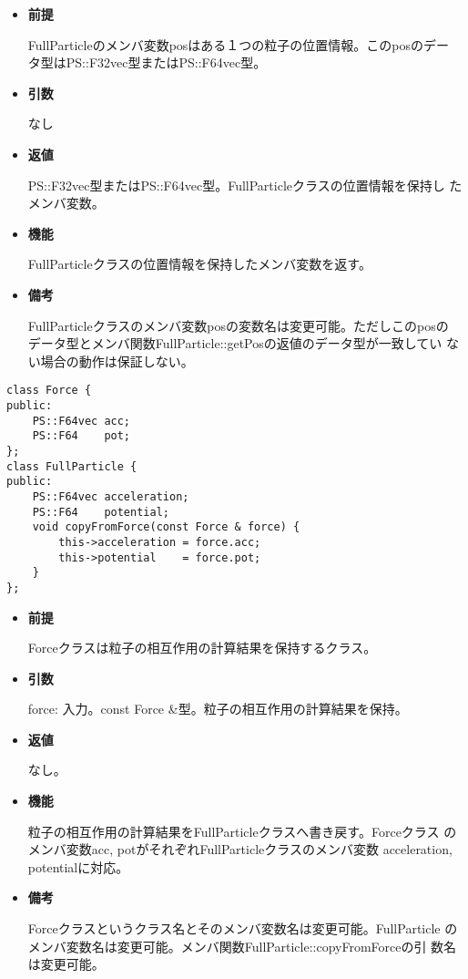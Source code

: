 \begin{itemize}

\item {\bf 前提}
  
  FullParticleのメンバ変数posはある１つの粒子の位置情報。このposのデー
  タ型はPS::F32vec型またはPS::F64vec型。
  
\item {\bf 引数}

  なし
  
\item {\bf 返値}

  PS::F32vec型またはPS::F64vec型。FullParticleクラスの位置情報を保持し
  たメンバ変数。
  
\item {\bf 機能}

  FullParticleクラスの位置情報を保持したメンバ変数を返す。
  
\item {\bf 備考}

  FullParticleクラスのメンバ変数posの変数名は変更可能。ただしこのposの
  データ型とメンバ関数FullParticle::getPosの返値のデータ型が一致してい
  ない場合の動作は保証しない。

\end{itemize}


\begin{screen}
\begin{verbatim}
class Force {
public:
    PS::F64vec acc;
    PS::F64    pot;
};
class FullParticle {
public:
    PS::F64vec acceleration;
    PS::F64    potential;
    void copyFromForce(const Force & force) {
        this->acceleration = force.acc;
        this->potential    = force.pot;
    }
};
\end{verbatim}
\end{screen}

\begin{itemize}

\item {\bf 前提}

  Forceクラスは粒子の相互作用の計算結果を保持するクラス。

\item {\bf 引数}

  force: 入力。const Force \&型。粒子の相互作用の計算結果を保持。
  
\item {\bf 返値}

  なし。
  
\item {\bf 機能}

  粒子の相互作用の計算結果をFullParticleクラスへ書き戻す。Forceクラス
  のメンバ変数acc, potがそれぞれFullParticleクラスのメンバ変数
  acceleration, potentialに対応。
  
\item {\bf 備考}

  Forceクラスというクラス名とそのメンバ変数名は変更可能。FullParticle
  のメンバ変数名は変更可能。メンバ関数FullParticle::copyFromForceの引
  数名は変更可能。

\end{itemize}

